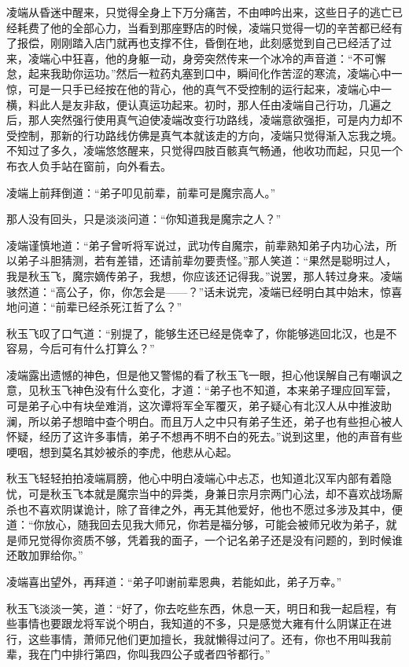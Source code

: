 凌端从昏迷中醒来，只觉得全身上下万分痛苦，不由呻吟出来，这些日子的逃亡已经耗费了他的全部心力，当看到那座野店的时候，凌端只觉得一切的辛苦都已经有了报偿，刚刚踏入店门就再也支撑不住，昏倒在地，此刻感觉到自己已经活了过来，凌端心中狂喜，他的身躯一动，身旁突然传来一个冰冷的声音道：“不可懈怠，起来我助你运功。”然后一粒药丸塞到口中，瞬间化作苦涩的寒流，凌端心中一惊，可是一只手已经按在他的背心，他的真气不受控制的运行起来，凌端心中一横，料此人是友非敌，便认真运功起来。初时，那人任由凌端自己行功，几遍之后，那人突然强行使用真气迫使凌端改变行功路线，凌端意欲强拒，可是内力却不受控制，那新的行功路线仿佛是真气本就该走的方向，凌端只觉得渐入忘我之境。不知过了多久，凌端悠悠醒来，只觉得四肢百骸真气畅通，他收功而起，只见一个布衣人负手站在窗前，向外看去。

凌端上前拜倒道：“弟子叩见前辈，前辈可是魔宗高人。”

那人没有回头，只是淡淡问道：“你知道我是魔宗之人？”

凌端谨慎地道：“弟子曾听将军说过，武功传自魔宗，前辈熟知弟子内功心法，所以弟子斗胆猜测，若有差错，还请前辈勿要责怪。”那人笑道：“果然是聪明过人，我是秋玉飞，魔宗嫡传弟子，我想，你应该还记得我。”说罢，那人转过身来。凌端骇然道：“高公子，你，你怎会是——？”话未说完，凌端已经明白其中始末，惊喜地问道：“前辈已经杀死江哲了么？”

秋玉飞叹了口气道：“别提了，能够生还已经是侥幸了，你能够逃回北汉，也是不容易，今后可有什么打算么？”

凌端露出遗憾的神色，但是他又警惕的看了秋玉飞一眼，担心他误解自己有嘲讽之意，见秋玉飞神色没有什么变化，才道：“弟子也不知道，本来弟子理应回军营，可是弟子心中有块垒难消，这次谭将军全军覆灭，弟子疑心有北汉人从中推波助澜，所以弟子想暗中查个明白。而且万人之中只有弟子生还，弟子也有些担心被人怀疑，经历了这许多事情，弟子不想再不明不白的死去。”说到这里，他的声音有些哽咽，想到莫名其妙被杀的李虎，他悲从心起。

秋玉飞轻轻拍拍凌端肩膀，他心中明白凌端心中忐忑，也知道北汉军内部有着隐忧，可是秋玉飞本就是魔宗当中的异类，身兼日宗月宗两门心法，却不喜欢战场厮杀也不喜欢阴谋诡计，除了音律之外，再无其他爱好，他也不愿过多涉及其中，便道：“你放心，随我回去见我大师兄，你若是福分够，可能会被师兄收为弟子，就是师兄觉得你资质不够，凭着我的面子，一个记名弟子还是没有问题的，到时候谁还敢加罪给你。”

凌端喜出望外，再拜道：“弟子叩谢前辈恩典，若能如此，弟子万幸。”

秋玉飞淡淡一笑，道：“好了，你去吃些东西，休息一天，明日和我一起启程，有些事情也要跟龙将军说个明白，我知道的不多，只是感觉大雍有什么阴谋正在进行，这些事情，萧师兄他们更加擅长，我就懒得过问了。还有，你也不用叫我前辈，我在门中排行第四，你叫我四公子或者四爷都行。”

